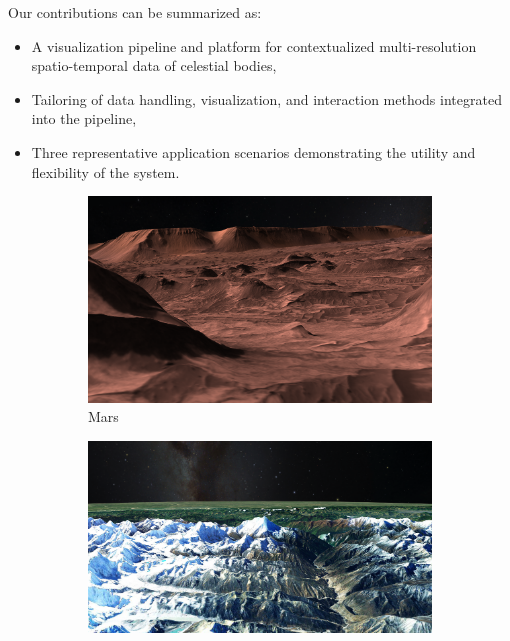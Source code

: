 \documentclass[journal]{vgtc}                %
\begin{document}
Our contributions can be summarized as:
\begin{itemize}
\item A visualization pipeline and platform for contextualized multi-resolution spatio-temporal data of celestial bodies,
\item Tailoring of data handling, visualization, and interaction methods integrated into the pipeline,
\item Three representative application scenarios demonstrating the utility and flexibility of the system.
\end{itemize}


\begin{figure}
\centering
    \begin{subfigure}{0.33\linewidth}
    	\includegraphics[width=\linewidth, height=0.6\linewidth]{figures/mars.png}
      \caption{Mars}
    \end{subfigure}
    \begin{subfigure}{0.33\linewidth}
    	\includegraphics[width=\linewidth, height=0.6\linewidth]{figures/earth.png}

\end{subfigure}
\end{figure}
\end{document}
